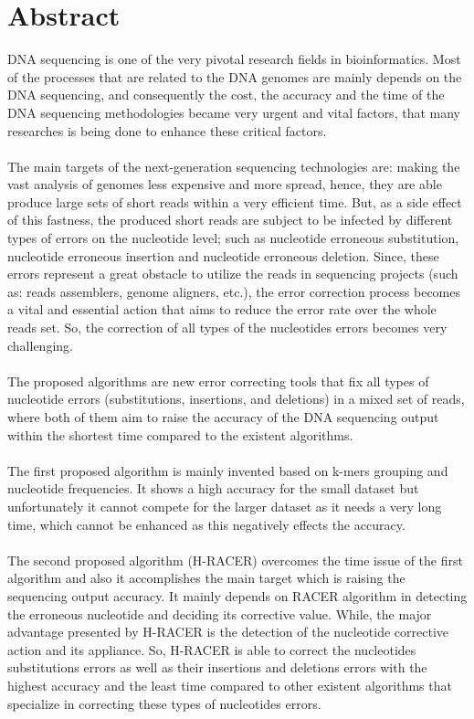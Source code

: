 \documentclass[12pt]{llncs}
\begin{document}
\section*{Abstract}
DNA sequencing is one of the very pivotal research fields in bioinformatics. Most of the processes that are related to the DNA genomes are mainly depends on the DNA sequencing, and consequently the cost, the accuracy and the time of the DNA sequencing methodologies became very urgent and vital factors, that many researches is being done to enhance these critical factors.
\\
\\
The main targets of the next-generation sequencing technologies are: making the vast analysis of genomes less expensive and more spread, hence, they are able produce large sets of short reads within a very efficient time. But, as a side effect of this fastness, the produced short reads are subject to be infected by different types of errors on the nucleotide level; such as nucleotide erroneous substitution, nucleotide erroneous insertion and nucleotide erroneous deletion. Since, these errors represent a great obstacle to utilize the reads in sequencing projects (such as: reads assemblers, genome aligners, etc.), the error correction process becomes a vital and essential action that aims to reduce the error rate over the whole reads set. So, the correction of all types of the nucleotides errors becomes very challenging.
\\
\\ 
The proposed algorithms are new error correcting tools that fix all types of nucleotide errors (substitutions, insertions, and deletions) in a mixed set of reads, where both of them aim to raise the accuracy of the DNA sequencing output within the shortest time compared to the existent algorithms. 
\\
\\
The first proposed algorithm is mainly invented based on k-mers grouping and nucleotide frequencies. It shows a high accuracy for the small dataset but unfortunately it cannot compete for the larger dataset as it needs a very long time, which cannot be enhanced as this negatively effects the accuracy.
\\
\\
The second proposed algorithm (H-RACER) overcomes the time issue of the first algorithm and also it accomplishes the main target which is raising the sequencing output accuracy. It mainly depends on RACER algorithm in detecting the erroneous nucleotide and deciding its corrective value. While, the major advantage presented by H-RACER is the detection of the nucleotide corrective action and its appliance. So, H-RACER is able to correct the nucleotides substitutions errors as well as their insertions and deletions errors with the highest accuracy and the least time compared to other existent algorithms that specialize in correcting these types of nucleotides errors.
\end{document}
